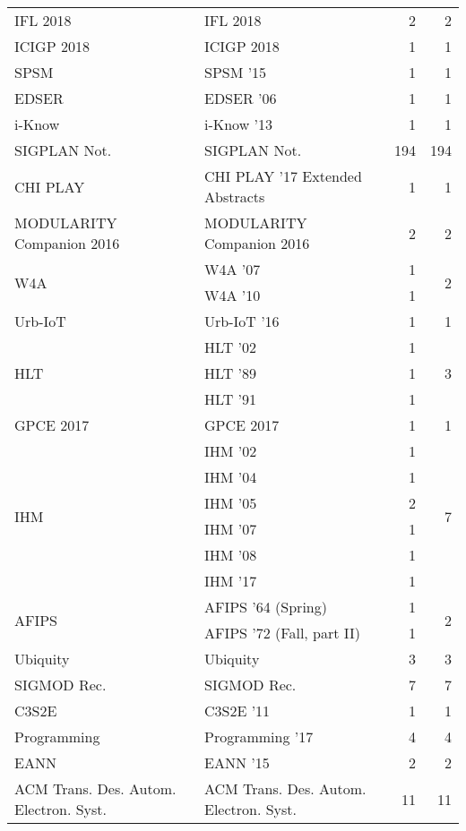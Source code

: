 \begin{table*}[t]
\begin{tabular}{llrr}
\multirow{1}{*}{IFL 2018} & IFL 2018 & 2 & \multirow{1}{*}{2}\\
\multirow{1}{*}{ICIGP 2018} & ICIGP 2018 & 1 & \multirow{1}{*}{1}\\
\multirow{1}{*}{SPSM } & SPSM '15 & 1 & \multirow{1}{*}{1}\\
\multirow{1}{*}{EDSER } & EDSER '06 & 1 & \multirow{1}{*}{1}\\
\multirow{1}{*}{i-Know } & i-Know '13 & 1 & \multirow{1}{*}{1}\\
\multirow{1}{*}{SIGPLAN Not.} & SIGPLAN Not. & 194 & \multirow{1}{*}{194}\\
\multirow{1}{*}{CHI PLAY } & CHI PLAY '17 Extended Abstracts & 1 & \multirow{1}{*}{1}\\
\multirow{1}{*}{MODULARITY Companion 2016} & MODULARITY Companion 2016 & 2 & \multirow{1}{*}{2}\\
\multirow{2}{*}{W4A } & W4A '07 & 1 & \multirow{2}{*}{2}\\
& W4A '10 & 1 &\\
\multirow{1}{*}{Urb-IoT } & Urb-IoT '16 & 1 & \multirow{1}{*}{1}\\
\multirow{3}{*}{HLT } & HLT '02 & 1 & \multirow{3}{*}{3}\\
& HLT '89 & 1 &\\
& HLT '91 & 1 &\\
\multirow{1}{*}{GPCE 2017} & GPCE 2017 & 1 & \multirow{1}{*}{1}\\
\multirow{6}{*}{IHM } & IHM '02 & 1 & \multirow{6}{*}{7}\\
& IHM '04 & 1 &\\
& IHM '05 & 2 &\\
& IHM '07 & 1 &\\
& IHM '08 & 1 &\\
& IHM '17 & 1 &\\
\multirow{2}{*}{AFIPS } & AFIPS '64 (Spring) & 1 & \multirow{2}{*}{2}\\
& AFIPS '72 (Fall, part II) & 1 &\\
\multirow{1}{*}{Ubiquity} & Ubiquity & 3 & \multirow{1}{*}{3}\\
\multirow{1}{*}{SIGMOD Rec.} & SIGMOD Rec. & 7 & \multirow{1}{*}{7}\\
\multirow{1}{*}{C3S2E } & C3S2E '11 & 1 & \multirow{1}{*}{1}\\
\multirow{1}{*}{Programming } & Programming '17 & 4 & \multirow{1}{*}{4}\\
\multirow{1}{*}{EANN } & EANN '15 & 2 & \multirow{1}{*}{2}\\
\multirow{1}{*}{ACM Trans. Des. Autom. Electron. Syst.} & ACM Trans. Des. Autom. Electron. Syst. & 11 & \multirow{1}{*}{11}\\

\end{tabular}
\end{table*}
